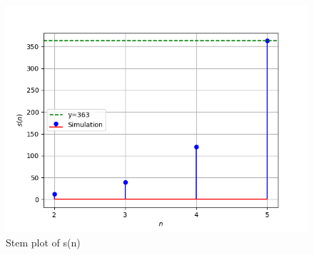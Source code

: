\documentclass[journal,12pt,twocolumn]{IEEEtran}
\theoremstyle{remark}
\begin{document}
\begin{figure}
  
  \includegraphics[width=\columnwidth]{ncert-maths/11/9/3/13/figs/graph.png}
  \caption{Stem plot of s(n)}
\end{figure}
\end{document}
